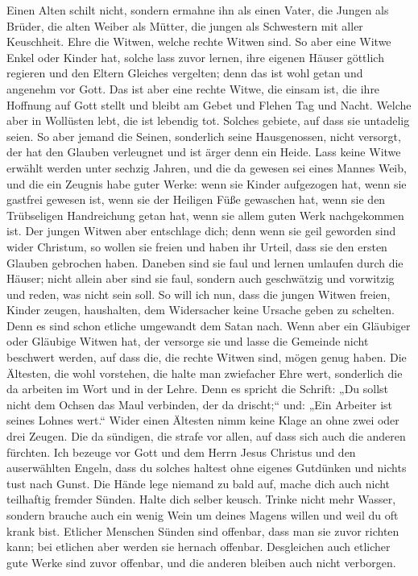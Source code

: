  Einen Alten schilt nicht, sondern ermahne ihn als einen
Vater, die Jungen als Brüder,  die alten Weiber als
Mütter, die jungen als Schwestern mit aller Keuschheit. 
Ehre die Witwen, welche rechte Witwen sind.  So aber eine
Witwe Enkel oder Kinder hat, solche lass zuvor lernen, ihre eigenen
Häuser göttlich regieren und den Eltern Gleiches vergelten; denn das ist
wohl getan und angenehm vor Gott.  Das ist aber eine
rechte Witwe, die einsam ist, die ihre Hoffnung auf Gott stellt und
bleibt am Gebet und Flehen Tag und Nacht.  Welche aber in
Wollüsten lebt, die ist lebendig tot.  Solches gebiete,
auf dass sie untadelig seien.  So aber jemand die Seinen,
sonderlich seine Hausgenossen, nicht versorgt, der hat den Glauben
verleugnet und ist ärger denn ein Heide.  Lass keine Witwe
erwählt werden unter sechzig Jahren, und die da gewesen sei eines Mannes
Weib,  und die ein Zeugnis habe guter Werke: wenn sie
Kinder aufgezogen hat, wenn sie gastfrei gewesen ist, wenn sie der
Heiligen Füße gewaschen hat, wenn sie den Trübseligen Handreichung getan
hat, wenn sie allem guten Werk nachgekommen ist.  Der
jungen Witwen aber entschlage dich; denn wenn sie geil geworden sind
wider Christum, so wollen sie freien  und haben ihr
Urteil, dass sie den ersten Glauben gebrochen haben. 
Daneben sind sie faul und lernen umlaufen durch die Häuser; nicht allein
aber sind sie faul, sondern auch geschwätzig und vorwitzig und reden,
was nicht sein soll.  So will ich nun, dass die jungen
Witwen freien, Kinder zeugen, haushalten, dem Widersacher keine Ursache
geben zu schelten.  Denn es sind schon etliche umgewandt
dem Satan nach.  Wenn aber ein Gläubiger oder Gläubige
Witwen hat, der versorge sie und lasse die Gemeinde nicht beschwert
werden, auf dass die, die rechte Witwen sind, mögen genug haben.
 Die Ältesten, die wohl vorstehen, die halte man
zwiefacher Ehre wert, sonderlich die da arbeiten im Wort und in der
Lehre.  Denn es spricht die Schrift: „Du sollst nicht dem
Ochsen das Maul verbinden, der da drischt;`` und: „Ein Arbeiter ist
seines Lohnes wert.``  Wider einen Ältesten nimm keine
Klage an ohne zwei oder drei Zeugen.  Die da sündigen,
die strafe vor allen, auf dass sich auch die anderen fürchten.
 Ich bezeuge vor Gott und dem Herrn Jesus Christus und
den auserwählten Engeln, dass du solches haltest ohne eigenes Gutdünken
und nichts tust nach Gunst.  Die Hände lege niemand zu
bald auf, mache dich auch nicht teilhaftig fremder Sünden. Halte dich
selber keusch.  Trinke nicht mehr Wasser, sondern brauche
auch ein wenig Wein um deines Magens willen und weil du oft krank bist.
 Etlicher Menschen Sünden sind offenbar, dass man sie
zuvor richten kann; bei etlichen aber werden sie hernach offenbar.
 Desgleichen auch etlicher gute Werke sind zuvor
offenbar, und die anderen bleiben auch nicht verborgen.


